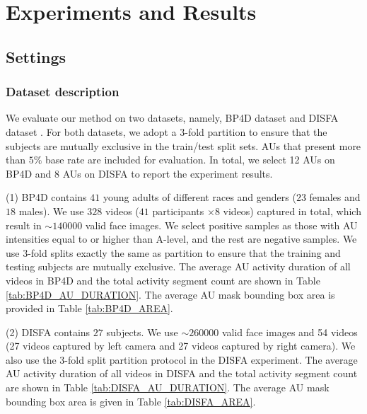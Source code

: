 \documentclass[5p,twocolumn]{elsarticle}
\newcommand{\etal}{\textit{et al}. }
\begin{document}
\section{Experiments and Results}
\label{sec:Experiment}
\subsection{Settings}
\subsubsection{Dataset description}
We evaluate our method on two datasets, namely, BP4D dataset \cite{zhang2014bp4d} and DISFA dataset \cite{mavadati2013disfa}. For both datasets, we adopt a 3-fold partition to ensure that the subjects are mutually exclusive in the train/test split sets. AUs that present more than $5\%$ base rate are included for evaluation. In total, we select 12 AUs on BP4D and 8 AUs on DISFA to report the experiment results. 

(1) BP4D \cite{zhang2014bp4d} contains $41$ young adults of different races and genders ($23$ females and $18$ males). We use $328$ videos ($41$ participants $\times 8$ videos) captured in total, which result in $\sim \num{140000}$ valid face images. We select positive samples as those with AU intensities equal to or higher than A-level, and the rest are negative samples. We use 3-fold splits exactly the same as \cite{li2017eac,li2017action} partition to ensure that the training and testing subjects are mutually exclusive. The average AU activity duration of all videos in BP4D and the total activity segment count are shown in Table \ref{tab:BP4D_AU_DURATION}. The average AU mask bounding box area is provided in Table \ref{tab:BP4D_AREA}.

(2) DISFA \cite{mavadati2013disfa} contains $27$ subjects. We use $\sim \num{260000}$ valid face images and 54 videos (27 videos captured by left camera and 27 videos captured by right camera).
We also use the 3-fold split partition protocol in the DISFA experiment. The average AU activity duration of all videos in DISFA and the total activity segment count are shown in Table \ref{tab:DISFA_AU_DURATION}. The average AU mask bounding box area is given in Table \ref{tab:DISFA_AREA}.
\begin{comment} Since DISFA dataset is smaller in diversity of AUs than BP4D, we do not directly train AU R-CNN on DISFA. Following Zhao \etal \cite{Zhao2016b} and Li \etal \cite{li2017eac,li2017action}'s cross dataset protocol setting, we train AU R-CNN on mixture datasets of entire BP4D dataset and 2 folds of DISFA, the rest DISFA fold is used for evaluation. The average AU activity duration of all videos in DISFA and the activity segments count are showed in Table \ref{tab:DISFA_AU_DURATION}. \end{comment}
\end{document}
